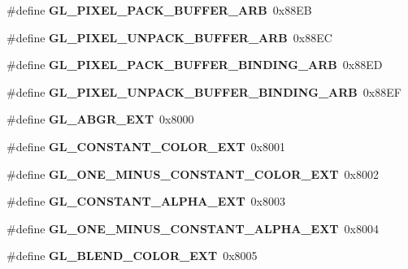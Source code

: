 \begin{DoxyCompactItemize}
\item 
\#define {\bfseries G\+L\+\_\+\+P\+I\+X\+E\+L\+\_\+\+P\+A\+C\+K\+\_\+\+B\+U\+F\+F\+E\+R\+\_\+\+A\+R\+B}~0x88\+E\+B\label{_s_d_l__opengl_8h_a33442ed4126f53a339ac7061baf89435}

\item 
\#define {\bfseries G\+L\+\_\+\+P\+I\+X\+E\+L\+\_\+\+U\+N\+P\+A\+C\+K\+\_\+\+B\+U\+F\+F\+E\+R\+\_\+\+A\+R\+B}~0x88\+E\+C\label{_s_d_l__opengl_8h_af287830aa9785013826e3bb81b2365bc}

\item 
\#define {\bfseries G\+L\+\_\+\+P\+I\+X\+E\+L\+\_\+\+P\+A\+C\+K\+\_\+\+B\+U\+F\+F\+E\+R\+\_\+\+B\+I\+N\+D\+I\+N\+G\+\_\+\+A\+R\+B}~0x88\+E\+D\label{_s_d_l__opengl_8h_a5fdcb9cc7488e9fafd3e1faf11cf6cde}

\item 
\#define {\bfseries G\+L\+\_\+\+P\+I\+X\+E\+L\+\_\+\+U\+N\+P\+A\+C\+K\+\_\+\+B\+U\+F\+F\+E\+R\+\_\+\+B\+I\+N\+D\+I\+N\+G\+\_\+\+A\+R\+B}~0x88\+E\+F\label{_s_d_l__opengl_8h_ab3b78d5b517fd0da0268c69e8aec4f52}

\item 
\#define {\bfseries G\+L\+\_\+\+A\+B\+G\+R\+\_\+\+E\+X\+T}~0x8000\label{_s_d_l__opengl_8h_aba576ffdac23399a47e57b1771c8b58f}

\item 
\#define {\bfseries G\+L\+\_\+\+C\+O\+N\+S\+T\+A\+N\+T\+\_\+\+C\+O\+L\+O\+R\+\_\+\+E\+X\+T}~0x8001\label{_s_d_l__opengl_8h_a3163be56d61841a830b74b1cd4cd94c1}

\item 
\#define {\bfseries G\+L\+\_\+\+O\+N\+E\+\_\+\+M\+I\+N\+U\+S\+\_\+\+C\+O\+N\+S\+T\+A\+N\+T\+\_\+\+C\+O\+L\+O\+R\+\_\+\+E\+X\+T}~0x8002\label{_s_d_l__opengl_8h_a371e2f91ba7a606110eeb79897b18a10}

\item 
\#define {\bfseries G\+L\+\_\+\+C\+O\+N\+S\+T\+A\+N\+T\+\_\+\+A\+L\+P\+H\+A\+\_\+\+E\+X\+T}~0x8003\label{_s_d_l__opengl_8h_a547d3c7f8887be69ac599993405eccca}

\item 
\#define {\bfseries G\+L\+\_\+\+O\+N\+E\+\_\+\+M\+I\+N\+U\+S\+\_\+\+C\+O\+N\+S\+T\+A\+N\+T\+\_\+\+A\+L\+P\+H\+A\+\_\+\+E\+X\+T}~0x8004\label{_s_d_l__opengl_8h_afd2f7cbb10dc976a31efb8189d06ffef}

\item 
\#define {\bfseries G\+L\+\_\+\+B\+L\+E\+N\+D\+\_\+\+C\+O\+L\+O\+R\+\_\+\+E\+X\+T}~0x8005\label{_s_d_l__opengl_8h_a60ec3cc2bc6c84b12ef218fa88f746de}


\end{DoxyCompactItemize}
